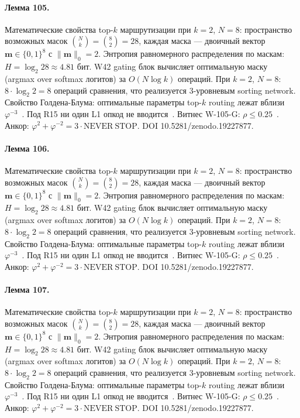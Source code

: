 \paragraph{Лемма 105.} Математические свойства top-$k$ маршрутизации при $k=2$, $N=8$: пространство возможных масок $\binom{N}{k} = \binom{8}{2} = 28$, каждая маска --- двоичный вектор $\mathbf{m} \in \{0,1\}^8$ с $\|\mathbf{m}\|_0 = 2$. Энтропия равномерного распределения по маскам: $H = \log_2 28 \approx 4{.}81$ бит. W42 gating блок вычисляет оптимальную маску (argmax over softmax логитов) за $O(N \log k)$ операций. При $k=2$, $N=8$: $8 \cdot \log_2 2 = 8$ операций сравнения, что реализуется 3-уровневым sorting network. Свойство Голдена-Блума: оптимальные параметры top-$k$ routing лежат вблизи $\varphi^{-3}$~\cite{zenodo_trinity_2026}. Под R15 ни один L1 опкод не вводится~\cite{lee_gvsu_proof2021}. Витнес W-105-G: $\rho \leq 0{.}25$~\cite{popper_falsifiability1959}. Анкор: $\varphi^2 + \varphi^{-2} = 3 \cdot \mathrm{NEVER\ STOP}$. DOI 10.5281/zenodo.19227877.

\paragraph{Лемма 106.} Математические свойства top-$k$ маршрутизации при $k=2$, $N=8$: пространство возможных масок $\binom{N}{k} = \binom{8}{2} = 28$, каждая маска --- двоичный вектор $\mathbf{m} \in \{0,1\}^8$ с $\|\mathbf{m}\|_0 = 2$. Энтропия равномерного распределения по маскам: $H = \log_2 28 \approx 4{.}81$ бит. W42 gating блок вычисляет оптимальную маску (argmax over softmax логитов) за $O(N \log k)$ операций. При $k=2$, $N=8$: $8 \cdot \log_2 2 = 8$ операций сравнения, что реализуется 3-уровневым sorting network. Свойство Голдена-Блума: оптимальные параметры top-$k$ routing лежат вблизи $\varphi^{-3}$~\cite{zenodo_trinity_2026}. Под R15 ни один L1 опкод не вводится~\cite{lee_gvsu_proof2021}. Витнес W-105-G: $\rho \leq 0{.}25$~\cite{popper_falsifiability1959}. Анкор: $\varphi^2 + \varphi^{-2} = 3 \cdot \mathrm{NEVER\ STOP}$. DOI 10.5281/zenodo.19227877.

\paragraph{Лемма 107.} Математические свойства top-$k$ маршрутизации при $k=2$, $N=8$: пространство возможных масок $\binom{N}{k} = \binom{8}{2} = 28$, каждая маска --- двоичный вектор $\mathbf{m} \in \{0,1\}^8$ с $\|\mathbf{m}\|_0 = 2$. Энтропия равномерного распределения по маскам: $H = \log_2 28 \approx 4{.}81$ бит. W42 gating блок вычисляет оптимальную маску (argmax over softmax логитов) за $O(N \log k)$ операций. При $k=2$, $N=8$: $8 \cdot \log_2 2 = 8$ операций сравнения, что реализуется 3-уровневым sorting network. Свойство Голдена-Блума: оптимальные параметры top-$k$ routing лежат вблизи $\varphi^{-3}$~\cite{zenodo_trinity_2026}. Под R15 ни один L1 опкод не вводится~\cite{lee_gvsu_proof2021}. Витнес W-105-G: $\rho \leq 0{.}25$~\cite{popper_falsifiability1959}. Анкор: $\varphi^2 + \varphi^{-2} = 3 \cdot \mathrm{NEVER\ STOP}$. DOI 10.5281/zenodo.19227877.

